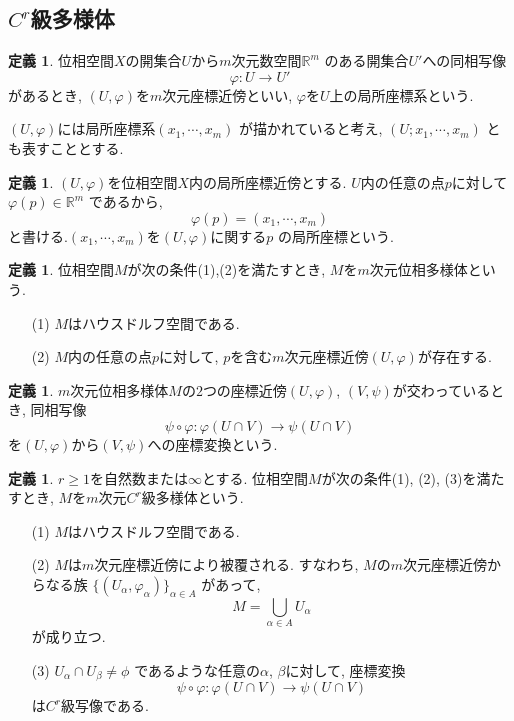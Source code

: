 \documentclass[a4j,12pt]{jarticle}
\theoremstyle{definition}
\newtheorem{definition}[theorem]{定義}
\begin{document}
\subsection{$C^r$級多様体}
\begin{definition}
    位相空間$X$の開集合$U$から$m$次元数空間$\mathbb{R}^m$
    のある開集合$U'$への同相写像
    $$\varphi:U\rightarrow U'$$
    があるとき, $(U, \varphi)$を$m$次元座標近傍といい, 
    $\varphi$を$U$上の局所座標系という. 
\end{definition}
$(U,\varphi)$には局所座標系$(x_1, \cdots ,x_m)$
    が描かれていると考え, $(U;x_1, \cdots ,x_m)$
    とも表すこととする. 
\begin{definition}
    $(U, \varphi)$を位相空間$X$内の局所座標近傍とする.
    $U$内の任意の点$p$に対して$\varphi(p) \in \mathbb{R}^m$
    であるから, 
    $$\varphi(p)=(x_1, \cdots ,x_m)$$
    と書ける.$(x_1, \cdots ,x_m)$を$(U, \varphi)$に関する$p$
    の局所座標という.
\end{definition}
\begin{definition}
    位相空間$M$が次の条件(1),(2)を満たすとき, 
    $M$を$m$次元位相多様体という. 
    \begin{itemize}
        \item[(1)]$M$はハウスドルフ空間である.
        \item[(2)]$M$内の任意の点$p$に対して, 
        $p$を含む$m$次元座標近傍$(U,\varphi)$が存在する.
    \end{itemize}
\end{definition}
\begin{definition}
    $m$次元位相多様体$M$の$2$つの座標近傍$(U, \varphi)$, 
    $(V, \psi)$が交わっているとき, 同相写像
    $$\psi \circ \varphi:\varphi(U\cap V)\rightarrow \psi(U\cap V)$$
    を$(U, \varphi)$から$(V, \psi)$への座標変換という. 
\end{definition}
\begin{definition}\label{def:C^r manifold}
    $r\geq 1$を自然数または$\infty$とする. 
    位相空間$M$が次の条件(1), (2), (3)を満たすとき, 
    $M$を$m$次元$C^r$級多様体という.
    \begin{itemize}
        \item[(1)]$M$はハウスドルフ空間である.
        \item[(2)]$M$は$m$次元座標近傍により被覆される. 
        すなわち, $M$の$m$次元座標近傍からなる族
        $\{(U_\alpha, \varphi_\alpha)\}_{\alpha \in A}$
        があって, 
        $$M = \bigcup_{\alpha \in A}U_\alpha$$
        が成り立つ. 
        \item[(3)]$U_\alpha \cap U_\beta \neq \phi$
        であるような任意の$\alpha$, $\beta$に対して, 座標変換
        $$\psi \circ \varphi:\varphi(U\cap V)\rightarrow \psi(U\cap V)$$
        は$C^r$級写像である. 
    \end{itemize}
\end{definition}
\end{document}

